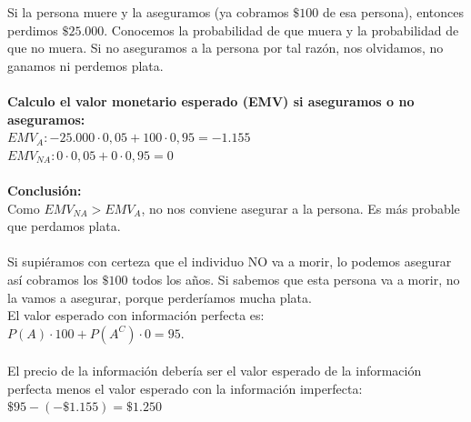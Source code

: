 \documentclass{article}
\begin{document}
        Si la persona muere y la aseguramos (ya cobramos $\$100$ de esa persona), entonces perdimos $\$25.000$. Conocemos la probabilidad de que muera y la probabilidad de que no muera. Si no aseguramos a la persona por tal razón, nos olvidamos, no ganamos ni perdemos plata.
        \\
        \\
        \textbf{Calculo el valor monetario esperado (EMV) si aseguramos o no aseguramos:}
        \\
        $EMV_{A}: -25.000 \cdot 0,05 + 100 \cdot 0,95 = -1.155$
        \\
        $EMV_{NA}: 0 \cdot 0,05 + 0 \cdot 0,95 = 0$
        \\
        \\
        \textbf{Conclusión:}
        \\
        Como $EMV_{NA} > EMV_{A}$, no nos conviene asegurar a la persona. Es más probable que perdamos plata.
        \\
        \\
        Si supiéramos con certeza que el individuo NO va a morir, lo podemos asegurar así cobramos los $\$100$ todos los años. Si sabemos que esta persona va a morir, no la vamos a asegurar, porque perderíamos mucha plata.
        \\
        El valor esperado con información perfecta es:
        \\
        $P(A) \cdot 100 + P(A^{C}) \cdot 0 = 95$.
        \\
        \\
        El precio de la información debería ser el valor esperado de la información perfecta menos el valor esperado con la información imperfecta:
        \\
        $\$95 - (-\$1.155) = \$1.250$
\end{document}
